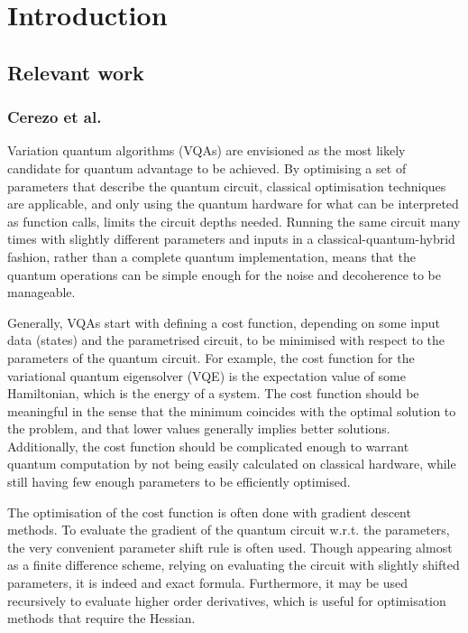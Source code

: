 \chapter{Introduction}

\section{Relevant work}


\subsection{Cerezo et al.}
Variation quantum algorithms (VQAs) are envisioned as the most likely candidate for quantum advantage to be achieved. By optimising a set of parameters that describe the quantum circuit, classical optimisation techniques are applicable, and only using the quantum hardware for what can be interpreted as function calls, limits the circuit depths needed. Running the same circuit many times with slightly different parameters and inputs in a classical-quantum-hybrid fashion, rather than a complete quantum implementation, means that the quantum operations can be simple enough for the noise and decoherence to be manageable.

Generally, VQAs start with defining a cost function, depending on some input data (states) and the parametrised circuit, to be minimised with respect to the parameters of the quantum circuit. For example, the cost function for the variational quantum eigensolver (VQE) is the expectation value of some Hamiltonian, which is the energy of a system. The cost function should be meaningful in the sense that the minimum coincides with the optimal solution to the problem, and that lower values generally implies better solutions. Additionally, the cost function should be complicated enough to warrant quantum computation by not being easily calculated on classical hardware, while still having few enough parameters to be efficiently optimised.

The optimisation of the cost function is often done with gradient descent methods. To evaluate the gradient of the quantum circuit w.r.t. the parameters, the very convenient parameter shift rule is often used. Though appearing almost as a finite difference scheme, relying on evaluating the circuit with slightly shifted parameters, it is indeed and exact formula. Furthermore, it may be used recursively to evaluate higher order derivatives, which is useful for optimisation methods that require the Hessian.

